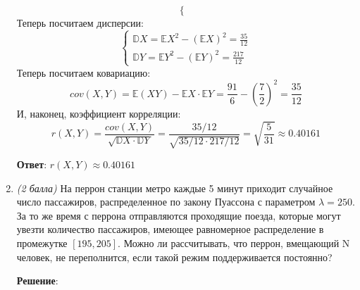 \documentclass{article}
\begin{document}
\begin{enumerate}
\begin{equation}
\begin{cases}
  \end{cases}
\end{equation}
Теперь посчитаем дисперсии:
\begin{equation}
  \begin{cases}
    \mathbb{D}X = \mathbb{E}X^2 - (\mathbb{E}X)^2 = \frac{35}{12} \\
    \mathbb{D}Y = \mathbb{E}Y^2 - (\mathbb{E}Y)^2 = \frac{217}{12}
  \end{cases}
\end{equation}
Теперь посчитаем ковариацию:
\begin{equation}
  cov (X, Y) = \mathbb{E}(XY) - \mathbb{E}X \cdot \mathbb{E}Y = \frac{91}{6} - \left(\frac{7}{2}\right)^2 = \frac{35}{12}
\end{equation}
И, наконец, коэффициент корреляции:
\begin{equation}
  r (X, Y) = \dfrac{cov (X, Y)}{\sqrt{\mathbb{D}X \cdot \mathbb{D}Y}} = \dfrac{35/12}{\sqrt{35/12 \cdot 217/12}} = \sqrt{\frac{5}{31}} \approx 0.40161
\end{equation}

\textbf{Ответ}:
$r (X, Y) \approx 0.40161$

\item \textit{(2 балла)} На перрон станции метро каждые 5 минут приходит случайное число пассажиров, распределенное по закону Пуассона с параметром $\lambda = 250$. За то же время с перрона отправляются проходящие поезда, которые могут увезти количество пассажиров, имеющее равномерное распределение в промежутке $[195, 205]$. Можно ли рассчитывать, что перрон, вмещающий N человек, не переполнится, если такой режим поддерживается постоянно?

\textbf{Решение}:


\end{enumerate}
\end{document}
